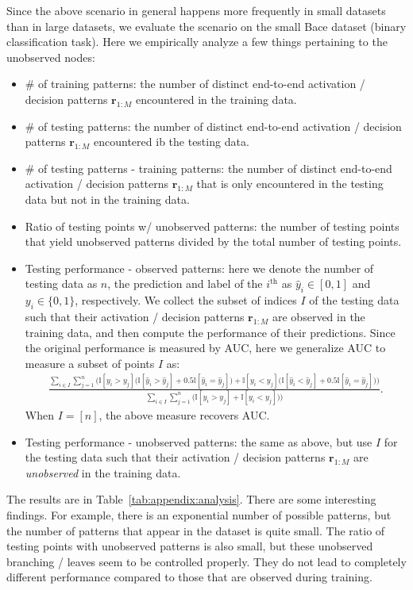 \documentclass{article} \usepackage{iclr2020_conference,times}
\def\vr{{\bm{r}}}
\newcommand{\one}{\mathbb{I}}
\begin{document}
Since the above scenario in general happens more frequently in small datasets than in large datasets, we evaluate the scenario on the small Bace dataset (binary classification task). Here we empirically analyze a few things pertaining to the unobserved nodes:
\begin{itemize}[leftmargin=4mm]
\vspace{-1mm}
    \item \# of training patterns: the number of distinct end-to-end activation / decision patterns $\vr_{1:M}$ encountered in the training data.
\vspace{-1mm}
    \item \# of testing patterns: the number of distinct end-to-end activation / decision patterns $\vr_{1:M}$ encountered ib the testing data.
\vspace{-1mm}
    \item \# of testing patterns - training patterns: the number of distinct end-to-end activation / decision patterns $\vr_{1:M}$ that is only encountered in the testing data but not in the training data.
\vspace{-1mm}
    \item Ratio of testing points w/ unobserved patterns: the number of testing points that yield unobserved patterns divided by the total number of testing points. 
\vspace{-1mm}
    \item Testing performance - observed patterns: here we denote the number of testing data as $n$, the prediction and label of the $i^\text{th}$ as $\hat y_i \in [0, 1]$ and $y_i \in \{0, 1\}$, respectively. We collect the subset of indices $I$ of the testing data such that their activation / decision patterns $\vr_{1:M}$ are observed in the training data, and then compute the performance of their predictions. Since the original performance is measured by AUC, here we generalize AUC to measure a subset of points $I$ as:
    \begin{align}
        \frac{\sum_{i \in I} \sum_{j=1}^n \bigg( \one[y_i > y_j] \Big(\one[\hat y_i > \hat y_j] + 0.5 \one[\hat y_i = \hat y_j] \Big) + \one[y_i < y_j] \Big(\one[\hat y_i < \hat y_j] + 0.5 \one[\hat y_i = \hat y_j] \Big) \bigg) }{\sum_{i \in I} \sum_{j=1}^n \bigg( \one[y_i > y_j] + \one[y_i < y_j] ) \bigg)}.
    \end{align}
    When $I = [n]$, the above measure recovers AUC. 
\vspace{-1mm}
    \item Testing performance - unobserved patterns: the same as above, but use $I$ for the testing data such that their activation / decision patterns $\vr_{1:M}$ are \emph{unobserved} in the training data.
\vspace{-1mm}
\end{itemize}
The results are in Table~\ref{tab:appendix:analysis}. There are some interesting findings. For example, there is an exponential number of possible patterns, but the number of patterns that appear in the dataset is quite small. The ratio of testing points with unobserved patterns is also small, but these unobserved branching / leaves seem to be controlled properly. They do not lead to completely different performance compared to those that are observed during training. 
\end{document}
